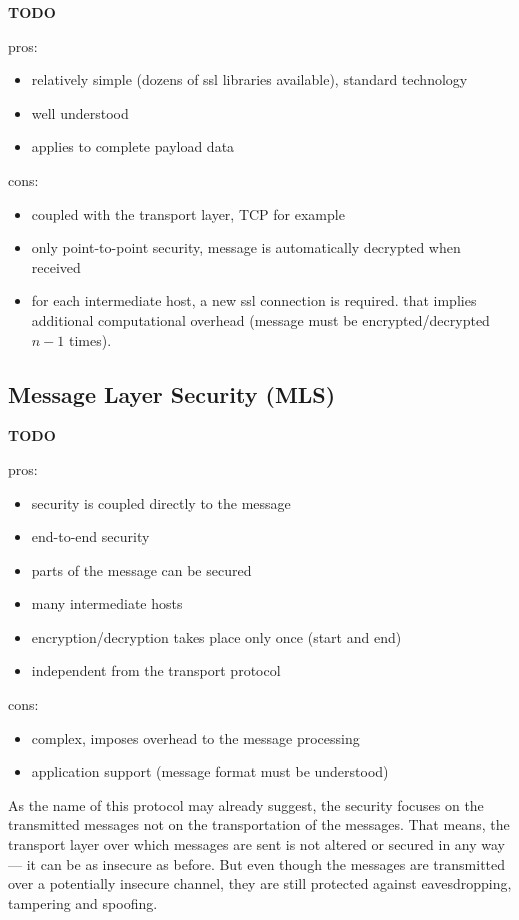 \textbf{TODO}

pros:
\begin{itemize}
\item relatively simple (dozens of ssl libraries available), standard technology
\item well understood
\item applies to complete payload data
\end{itemize}
cons:
\begin{itemize}
\item coupled with the transport layer, TCP for example
\item only point-to-point security, \ie message is automatically decrypted
  when received
\item for each intermediate host, a new ssl connection is required. that
  implies additional computational overhead (message must be
  encrypted/decrypted $n-1$ times).
\end{itemize}

\subsection[Message Layer Security]{Message Layer Security (MLS)}
\label{sec:fundamentals:mls}

\textbf{TODO}

\cite{mls, oasis-wss}

pros:
\begin{itemize}
\item security is coupled directly to the message
\item end-to-end security
\item parts of the message can be secured
\item many intermediate hosts
\item encryption/decryption takes place only once (start and end)
\item independent from the transport protocol
\end{itemize}
cons:
\begin{itemize}
\item complex, imposes overhead to the message processing
\item application support (message format must be understood)
\end{itemize}

As the name of this protocol  may already suggest, the security focuses on
the transmitted messages not on  the transportation of the messages.  That
means, the transport layer over which  messages are sent is not altered or
secured in any way  --- it can be as insecure as  before.  But even though
the messages are transmitted over a potentially insecure channel, they are
still protected against eavesdropping, tampering and spoofing.

